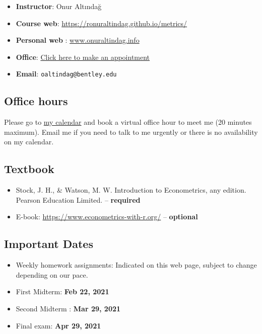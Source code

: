 \documentclass[
]{book}
\providecommand{\tightlist}{%
  \setlength{\itemsep}{0pt}\setlength{\parskip}{0pt}}
\begin{document}
\begin{itemize}
\tightlist
\item
  \textbf{Instructor}: Onur Altındağ
\item
  \textbf{Course web}: \url{https://ronuraltindag.github.io/metrics/}
\item
  \textbf{Personal web} : \href{https://www.onuraltindag.info/}{www.onuraltindag.info}
\item
  \textbf{Office}: \href{https://calendly.com/ronuraltindag/office_hrs}{Click here to make an appointment}
\item
  \textbf{Email}: \texttt{oaltindag@bentley.edu}
\end{itemize}

\hypertarget{office-hours}{%
\subsection*{Office hours}\label{office-hours}}

Please go to \href{https://calendly.com/ronuraltindag/office_hrs}{my calendar} and book a virtual office hour to meet me (20 minutes maximum). Email me if you need to talk to me urgently or there is no availability on my calendar.

\hypertarget{textbook}{%
\subsection*{Textbook}\label{textbook}}

\begin{itemize}
\tightlist
\item
  Stock, J. H., \& Watson, M. W. Introduction to Econometrics, any edition. Pearson Education Limited. -- \textbf{required}
\item
  E-book: \url{https://www.econometrics-with-r.org/} -- \textbf{optional}
\end{itemize}

\hypertarget{important-dates}{%
\subsection*{Important Dates}\label{important-dates}}

\begin{itemize}
\tightlist
\item
  Weekly homework assignments: Indicated on this web page, subject to change depending on our pace.\\
\item
  First Midterm: \textbf{Feb 22, 2021}\\
\item
  Second Midterm : \textbf{Mar 29, 2021}
\item
  Final exam: \textbf{Apr 29, 2021}
\end{itemize}
\end{document}
